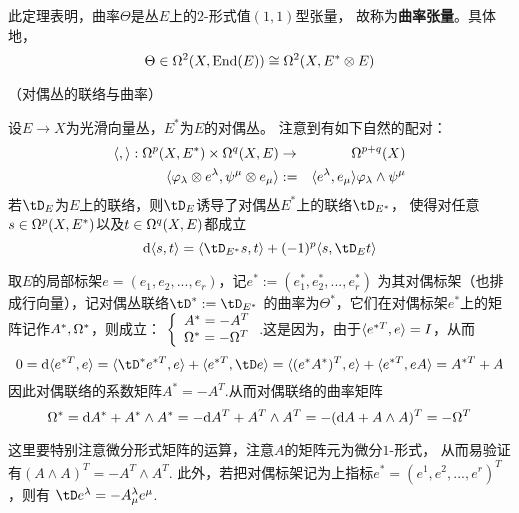 \begin{rem}
此定理表明，曲率$\Theta$是丛$E$上的$2$-形式值$(1,1)$型张量，
故称为\textbf{曲率张量}。具体地，
$$\Theta\in\Omega^2(X,\operatorname{End}(E))\cong\Omega^2(X,E^*\otimes E)$$
\end{rem}


\begin{Example}（对偶丛的联络与曲率）

设$E\to X$为光滑向量丛，$E^*$为$E$的对偶丛。
注意到有如下自然的配对：
\begin{eqnarray*}
     \langle , \rangle:
     \Omega^p(X,E^*)\times\Omega^q(X,E)
     &\to&\Omega^{p+q}(X)
\\
     \langle \varphi_\lambda\otimes e^\lambda,\psi^\mu\otimes e_\mu \rangle
&:=&
     \langle e^{\lambda},e_\mu \rangle
     \varphi_\lambda\wedge\psi^\mu
\end{eqnarray*}
若$\tD_E$为$E$上的联络，则$\tD_E$诱导了对偶丛$E^*$上的联络$\tD_{E^*}$，
使得对任意$s\in\Omega^p(X,E^*)$以及$t\in\Omega^q(X,E)$都成立
$$
  \td\pair{s}{t}
=
  \pair{\tD_{E^*}s}{t}
 +(-1)^p\pair{s}{\tD_E t}
$$
\end{Example}

取$E$的局部标架$e=(e_1,e_2,...,e_r)$，记$e^*:=(e_1^*,e_2^*,...,e_r^*)$
为其对偶标架（也排成行向量），记对偶丛联络$\tD^*:=\tD_{E^*}$
的曲率为$\Theta^*$，它们在对偶标架$e^*$上的矩阵记作$A^*,\Omega^*$，则成立：
$
  \left\{
    \begin{array}{l}
      A^*=-A^T\\
      \Omega^*=-\Omega^T
    \end{array}
  \right.
$.这是因为，由于$\langle e^{*T},e \rangle=I$，从而
$$
  0=\td\pair{e^{*T}}{e}
=\pair{\tD^* e^{*T}}{e}+\pair{e^{*T}}{\tD e}
=\pair{(e^*A^*)^T}{e}+\pair{e^{*T}}{eA}
=A^{*T}+A
$$
因此对偶联络的系数矩阵$A^*=-A^T$.从而对偶联络的曲率矩阵
$$
  \Omega^*=\mathrm{d} A^*+A^*\wedge A^*
        =-\mathrm{d} A^T+A^T\wedge A^T
        =-(\mathrm{d} A+A\wedge A)^T
        =-\Omega^T
$$

这里要特别注意微分形式矩阵的运算，注意$A$的矩阵元为微分$1$-形式，
从而易验证有$(A\wedge A)^T=-A^T\wedge A^T$.
此外，若把对偶标架记为上指标$e^*=(e^1,e^2,...,e^r)^T$，则有
$\tD e^\lmd=-A^\lmd_\mu e^\mu$.


